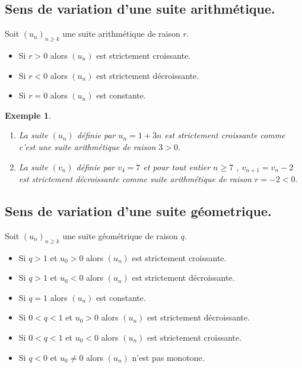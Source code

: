 \documentclass[a4paper,11pt]{article}
\theoremstyle{break}
\newcounter{enonce}
\newtheorem{exemple}[enonce]{Exemple}
\begin{document}
 \subsection{Sens de variation d'une suite arithmétique.}
 
 \begin{theorem}
  Soit $(u_n)_{n \geq k}$ une suite arithmétique de raison $r$.
  \begin{itemize}
   \item Si $r >0$ alors $(u_n)$ est strictement croissante.
   \item Si $r<0$ alors $(u_n)$ est strictement décroissante.
   \item Si $r=0$ alors $(u_n)$ est constante.
  \end{itemize}
 \end{theorem}
 
 \begin{exemple}
    
    \begin{enumerate}
     \item La suite $(u_n)$ définie par $u_n=1+3n$ est strictement croissante comme 
     c'est une suite arithmétique de raison $3>0$.
     \item La suite $(v_n)$ définie par $v_4=7$ et pour tout entier $n \geq 7$
     , $v_{n+1}=v_n -2$ est strictement décroissante comme suite arithmétique de raison $r=-2<0$.
    \end{enumerate}
 \end{exemple}
 
   \subsection{Sens de variation d'une suite géometrique.}
 
 \begin{theorem}
  Soit $(u_n)_{n \geq k}$ une suite géométrique de raison $q$.
  \begin{itemize}
   \item Si $q > 1$ et $u_0>0$ alors $(u_n)$ est strictement croissante.
   \item Si $q > 1$ et $u_0<0$ alors $(u_n)$ est strictement décroissante.
   \item Si $q = 1$ alors $(u_n)$ est constante.
   \item Si $0 < q < 1$ et $u_0>0$ alors $(u_n)$ est strictement décroissante.
   \item Si $0 < q < 1$ et $u_0<0$ alors $(u_n)$ est strictement croissante.
   \item Si $q < 0$ et $u_0 \neq 0$ alors $(u_n)$ n'est pas monotone.
  \end{itemize}
 \end{theorem}
 
\end{document}
